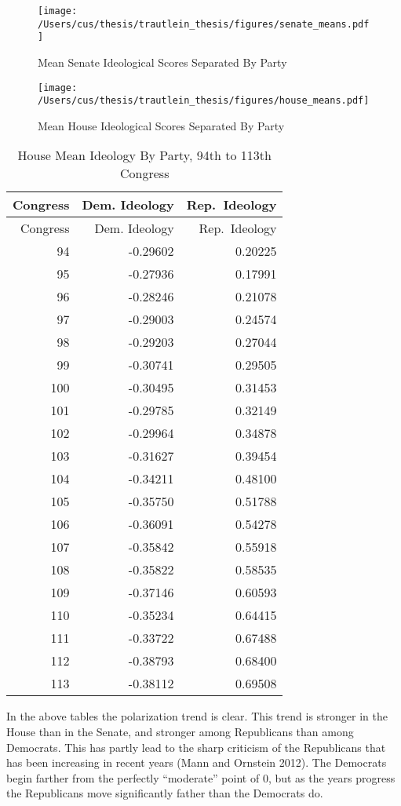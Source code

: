 \documentclass[12pt,twoside]{reedthesis}
\begin{document}
  \begin{figure}[h!tbp]
  \centering
  \texttt{[image: /Users/cus/thesis/trautlein\_thesis/figures/senate\_means.pdf]}
  \caption[Mean Senate Ideological Scores Separated By Party]{\normalsize{Mean Senate Ideological Scores Separated By Party}}
  \label{fig:def}
  \end{figure}
  
  \begin{figure}[h!tbp]
  \centering
  \texttt{[image: /Users/cus/thesis/trautlein\_thesis/figures/house\_means.pdf]}
  \caption[Mean House Ideological Scores Separated By Party]{\normalsize{Mean House Ideological Scores Separated By Party}}
  \label{fig:def}
  \end{figure}
  
  \begin{longtable}[c]{@{}rrr@{}}
  \caption{House Mean Ideology By Party, 94th to 113th
  Congress}\tabularnewline
  \toprule
  Congress & Dem. Ideology & Rep.~Ideology\tabularnewline
  \midrule
  \endfirsthead
  \toprule
  Congress & Dem. Ideology & Rep.~Ideology\tabularnewline
  \midrule
  \endhead
  94 & -0.29602 & 0.20225\tabularnewline
  95 & -0.27936 & 0.17991\tabularnewline
  96 & -0.28246 & 0.21078\tabularnewline
  97 & -0.29003 & 0.24574\tabularnewline
  98 & -0.29203 & 0.27044\tabularnewline
  99 & -0.30741 & 0.29505\tabularnewline
  100 & -0.30495 & 0.31453\tabularnewline
  101 & -0.29785 & 0.32149\tabularnewline
  102 & -0.29964 & 0.34878\tabularnewline
  103 & -0.31627 & 0.39454\tabularnewline
  104 & -0.34211 & 0.48100\tabularnewline
  105 & -0.35750 & 0.51788\tabularnewline
  106 & -0.36091 & 0.54278\tabularnewline
  107 & -0.35842 & 0.55918\tabularnewline
  108 & -0.35822 & 0.58535\tabularnewline
  109 & -0.37146 & 0.60593\tabularnewline
  110 & -0.35234 & 0.64415\tabularnewline
  111 & -0.33722 & 0.67488\tabularnewline
  112 & -0.38793 & 0.68400\tabularnewline
  113 & -0.38112 & 0.69508\tabularnewline
  \bottomrule
  \end{longtable}
  
  In the above tables the polarization trend is clear. This trend is
  stronger in the House than in the Senate, and stronger among Republicans
  than among Democrats. This has partly lead to the sharp criticism of the
  Republicans that has been increasing in recent years (Mann and Ornstein
  2012). The Democrats begin farther from the perfectly ``moderate'' point
  of 0, but as the years progress the Republicans move significantly
  father than the Democrats do.
  
\end{document}
